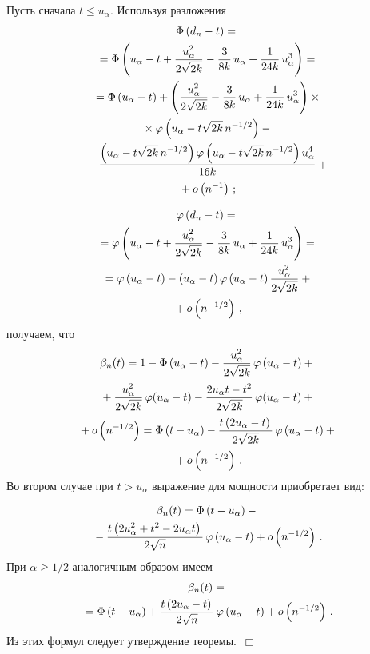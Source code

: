 \begin{multicols}{2}
Пусть сначала $t \le u_\alpha$.
Используя разложения
\begin{multline*}
\Phi\left(d_n-t\right)={}\\
{}=\Phi\left(u_\alpha-t+
\fr{u_\alpha^2}{2\sqrt{2k}}-\fr{3}{8k}\,u_\alpha+
\fr{1}{24k}\,u_\alpha^3\right)={}\\
{}=\Phi\left(u_\alpha-t\right)+
\left(\fr{u_\alpha^2}{2\sqrt{2k}}-\fr{3}{8k}\,u_\alpha+
\fr{1}{24k}\,u_\alpha^3\right)\times{}\\
{}\times\varphi\left(u_\alpha-t\sqrt{2k}\,n^{-1/2}\right)-{}
\\
{}-
\fr{\left(u_\alpha-t\sqrt{2k}\,n^{-1/2}\right)\varphi\left(u_\alpha-
t\sqrt{2k}\,n^{-1/2}\right)u_\alpha^4}{16k}+{}\\
{}+ o\left(n^{-1}\right)\,; 
\end{multline*}

\vspace*{-12pt}

\noindent
\begin{multline*}
\varphi\left(d_n-t\right)={}\\
{}= \varphi\left(u_\alpha-t+
\fr{u_\alpha^2}{2\sqrt{2k}}-\fr{3}{8k}\,u_\alpha+
\fr{1}{24k}\,u_\alpha^3\right)={}\\
{}=
\varphi\left(u_\alpha-t\right)-\left(u_\alpha-t\right)
\varphi\left(u_\alpha-t\right)\fr{u_\alpha^2}{2\sqrt{2k}}+{}\\
{}+
o\left(n^{-1/2}\right)\,,
\end{multline*}
получаем, что
\begin{multline*}
\beta_n(t)=1-\Phi\left(u_\alpha-t\right)-
\fr{u_\alpha^2}{2\sqrt{2k}}\,\varphi\left(u_\alpha-t\right)+{}\\
{}+\fr{u_\alpha^2}{2\sqrt{2k}}\,\varphi(u_\alpha-t)-
\fr{2u_\alpha t - t^2}{2\sqrt{2k}}\,\varphi(u_\alpha-t)+{}\\
{}+
o\left(n^{-1/2}\right)=
\Phi\left(t-u_\alpha\right)-\fr{t\left(2u_\alpha - t\right)}{2\sqrt{2k}}\,
\varphi\left(u_\alpha - t\right)+{}\\
{}+ o\left(n^{-1/2}\right)\,.
\end{multline*}
Во втором случае при $t > u_\alpha$  выражение
для мощности приобретает вид:

\noindent
\begin{multline*}
\beta_n(t)=\Phi\left(t-u_\alpha\right)-{}\\
{}-
\fr{t\left(2u_\alpha^2+t^2 -2u_\alpha t\right)}{2\sqrt{n}}\,
\varphi\left(u_\alpha-t\right)+ o\left(n^{-1/2}\right)\,.
\end{multline*}
При $\alpha \ge 1/2$  аналогичным образом имеем
\begin{multline*}
\beta_n(t)={}\\
{}=
 \Phi\left(t-u_\alpha\right)+
\fr{t\left(2u_\alpha - t\right)}{2\sqrt{n}}\,\varphi\left(u_\alpha - t\right)+
o\left(n^{-1/2}\right)\,.
\end{multline*}
Из этих формул следует утверждение теоремы.~$\Box$


\end{multicols}

